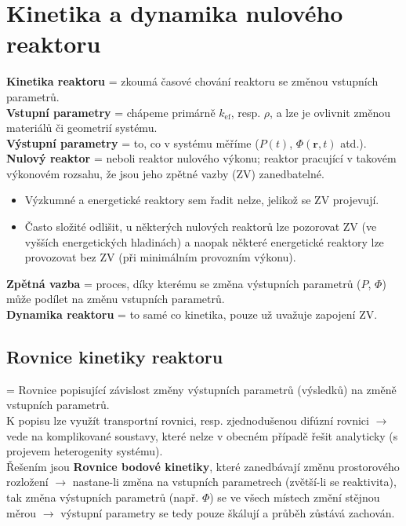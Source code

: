 \section{Kinetika a dynamika nulového reaktoru}

\textbf{Kinetika reaktoru} = zkoumá časové chování reaktoru se změnou vstupních parametrů.\\

\textbf{Vstupní parametry} = chápeme primárně $k_{\text{ef}}$, resp. $\rho$, a lze je ovlivnit změnou materiálů či geometrií systému.\\

\textbf{Výstupní parametry} = to, co v systému měříme ($P(t)$, $\Phi (\textbf{r}, t) $ atd.).\\

\textbf{Nulový reaktor} = neboli reaktor nulového výkonu; reaktor pracující v takovém výkonovém rozsahu, že jsou jeho zpětné vazby (ZV) zanedbatelné.

\begin{itemize}
  \item Výzkumné a energetické reaktory sem řadit nelze, jelikož se ZV projevují.
  \item Často složité odlišit, u některých nulových reaktorů lze pozorovat ZV (ve vyšších energetických hladinách) a naopak některé energetické reaktory lze provozovat bez ZV (při minimálním provozním výkonu).
\end{itemize}

\textbf{Zpětná vazba} = proces, díky kterému se změna výstupních parametrů ($P$, $\Phi$) může podílet na změnu vstupních parametrů.\\

\textbf{Dynamika reaktoru} = to samé co kinetika, pouze už uvažuje zapojení ZV.

\subsection{Rovnice kinetiky reaktoru}

= Rovnice popisující závislost změny výstupních parametrů (výsledků) na změně vstupních parametrů.\\

K popisu lze využít transportní rovnici, resp. zjednodušenou difúzní rovnici $\rightarrow$ vede na komplikované soustavy, které nelze v obecném případě řešit analyticky (s projevem heterogenity systému).\\

Řešením jsou \textbf{Rovnice bodové kinetiky}, které zanedbávají změnu prostorového rozložení $\rightarrow$ nastane-li změna na vstupních parametrech (zvětší-li se reaktivita), tak změna výstupních parametrů (např. $\Phi$) se ve všech místech změní stějnou měrou $\rightarrow$ výstupní parametry se tedy pouze škálují a průběh zůstává zachován.\\

